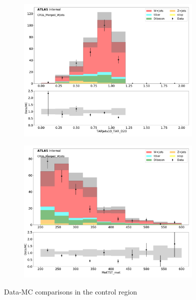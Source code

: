 \begin{figure}[htbp]
\begin{subfigure}{0.49\textwidth}
     \includegraphics[width = 0.98\textwidth]{Figures/4/datamc/CR1L_Merged_WJets/TARJets10_TAR_D20.pdf}
     \caption{\DtwoTAR}
     \end{subfigure}
     \begin{subfigure}{0.49\textwidth}
     \includegraphics[width = 0.98\textwidth]{Figures/4/datamc/CR1L_Merged_WJets/MetTST_met.pdf}
     \caption{\met}
     \end{subfigure}

     \caption{Data-MC comparisons in the \merged \wjets control region}
     \label{fig:Data_MC_CRdR_merged}
  \end{figure}

